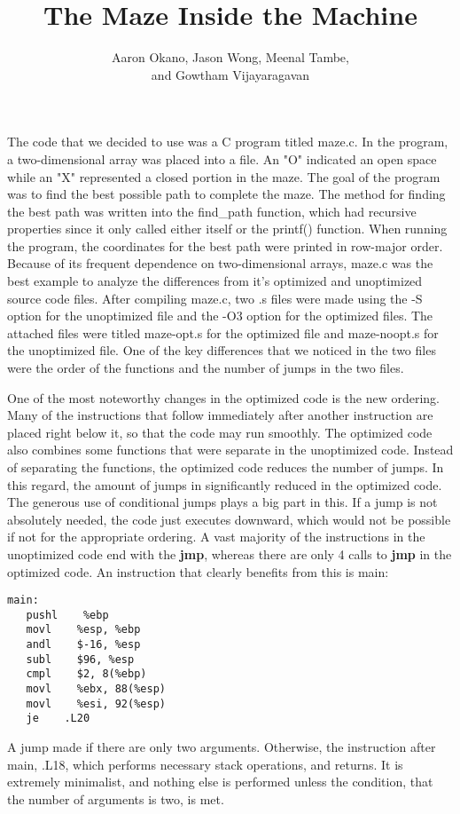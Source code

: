 \documentclass[12pt,letterpaper]{article}
\title{The Maze Inside the Machine}
\author{Aaron Okano, Jason Wong, Meenal Tambe, \\ and Gowtham Vijayaragavan}
\begin{document}
\setcounter{page}{1}
\maketitle

The code that we decided to use was a C program titled maze.c. 
In the program, a two-dimensional array was placed into a file. An "O" indicated an open space while an "X" represented a closed portion in the maze. The goal of the program was to find the best possible path to complete the maze. The method for finding the best path was written into the find\_path function, which had recursive properties since it only called either itself or the printf() function. When running the program, the coordinates for the best path were printed in row-major order. Because of its frequent dependence on two-dimensional arrays, maze.c was the best example to analyze the differences from it's optimized and unoptimized source code files.
After compiling maze.c, two .s files were made using the -S option for the unoptimized file and the -O3 option for the optimized files. The attached files were titled maze-opt.s for the optimized file and maze-noopt.s for the unoptimized file. One of the key differences that we noticed in the two files were the order of the functions and the number of jumps in the two files.

One of the most noteworthy changes in the optimized code is the new ordering. Many of the instructions that follow immediately after another instruction are placed right below it, so that the code may run smoothly. The optimized code also combines some functions that were separate in the unoptimized code. Instead of separating the functions, the optimized code reduces the number of jumps. In this regard, the amount of jumps in significantly reduced in the optimized code. The generous use of conditional jumps plays a big part in this. If a jump is not absolutely needed, the code just executes downward, which would not be possible if not for the appropriate ordering. A vast majority of the instructions in the unoptimized code end with the {\bf jmp}, whereas there are only 4 calls to {\bf jmp} in the optimized code. An instruction that clearly benefits from this is main:
\begin{verbatim}
main:
   pushl    %ebp
   movl    %esp, %ebp
   andl    $-16, %esp
   subl    $96, %esp
   cmpl    $2, 8(%ebp)
   movl    %ebx, 88(%esp)
   movl    %esi, 92(%esp)
   je    .L20
\end{verbatim}
A jump made if there are only two arguments. Otherwise, the instruction after main, .L18, which performs necessary stack operations, and returns. It is extremely minimalist, and nothing else is performed unless the condition, that the number of arguments is two, is met.
\end{document}
